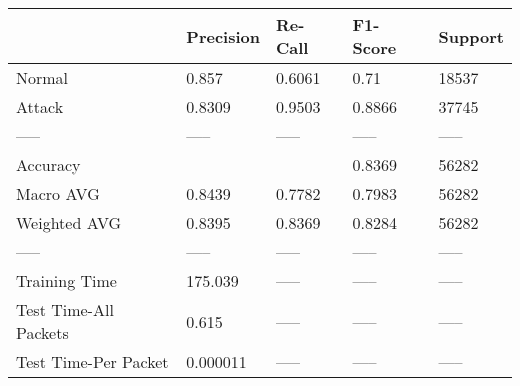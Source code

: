 \begin{tabular}{lllll}
\toprule
{} & Precision & Re-Call & F1-Score & Support \\
\midrule
Normal                &     0.857 &  0.6061 &     0.71 &   18537 \\
Attack                &    0.8309 &  0.9503 &   0.8866 &   37745 \\
-----                 &     ----- &   ----- &    ----- &   ----- \\
Accuracy              &           &         &   0.8369 &   56282 \\
Macro AVG             &    0.8439 &  0.7782 &   0.7983 &   56282 \\
Weighted AVG          &    0.8395 &  0.8369 &   0.8284 &   56282 \\
-----                 &     ----- &   ----- &    ----- &   ----- \\
Training Time         &   175.039 &   ----- &    ----- &   ----- \\
Test Time-All Packets &     0.615 &   ----- &    ----- &   ----- \\
Test Time-Per Packet  &  0.000011 &   ----- &    ----- &   ----- \\
\bottomrule
\end{tabular}
